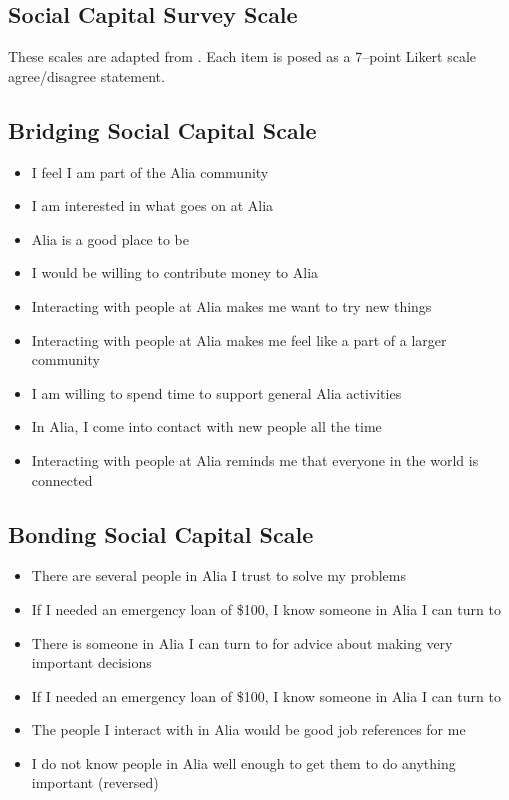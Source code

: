 \documentclass[11pt]{article}
\begin{document}
\pagebreak
\begin{appendices}

\section{Social Capital Survey Scale}
These scales are adapted from \citet*{ellison2007benefits}.
Each item is posed as a 7--point Likert scale agree/disagree statement.

\subsection*{Bridging Social Capital Scale}
\begin{itemize}
  \item I feel I am part of the Alia community
  \item I am interested in what goes on at Alia
  \item Alia is a good place to be
  \item I would be willing to contribute money to Alia
  \item Interacting with people at Alia makes me want to try new things
  \item Interacting with people at Alia makes me feel like a part of a larger community
  \item I am willing to spend time to support general Alia activities
  \item In Alia, I come into contact with new people all the time
  \item Interacting with people at Alia reminds me that everyone in the world is connected
\end{itemize}


\subsection*{Bonding Social Capital Scale}
\begin{itemize}
  \item There are several people in Alia I trust to solve my problems
  \item If I needed an emergency loan of \$100, I know someone in Alia I can turn to
  \item There is someone in Alia I can turn to for advice about making very important decisions
  \item If I needed an emergency loan of \$100, I know someone in Alia I can turn to
  \item The people I interact with in Alia would be good job references for me
  \item I do not know people in Alia well enough to get them to do anything important (reversed)
\end{itemize}

\end{appendices}


\pagebreak


\end{document}

